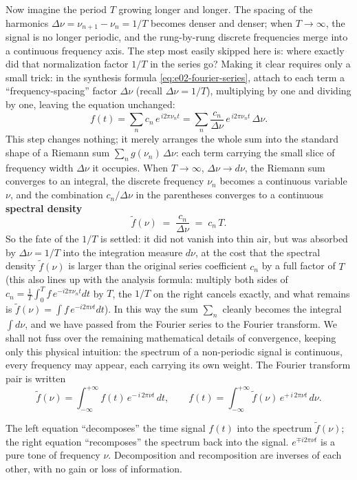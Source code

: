 Now imagine the period \(T\) growing longer and longer. The spacing of the harmonics \(\Delta\nu=\nu_{n+1}-\nu_n=1/T\) becomes denser and denser; when \(T\to\infty\), the signal is no longer periodic, and the rung-by-rung discrete frequencies merge into a continuous frequency axis. The step most easily skipped here is: where exactly did that normalization factor \(1/T\) in the series go? Making it clear requires only a small trick: in the synthesis formula \eqref{eq:e02-fourier-series}, attach to each term a ``frequency-spacing'' factor \(\Delta\nu\) (recall \(\Delta\nu=1/T\)), multiplying by one and dividing by one, leaving the equation unchanged:
\[
  f(t)=\sum_{n} c_n\,e^{\,i2\pi\nu_n t}
      =\sum_{n} \frac{c_n}{\Delta\nu}\,e^{\,i2\pi\nu_n t}\,\Delta\nu .
\]
This step changes nothing; it merely arranges the whole sum into the standard shape of a Riemann sum \(\sum_n g(\nu_n)\,\Delta\nu\): each term carrying the small slice of frequency width \(\Delta\nu\) it occupies. When \(T\to\infty\), \(\Delta\nu\to d\nu\), the Riemann sum converges to an integral, the discrete frequency \(\nu_n\) becomes a continuous variable \(\nu\), and the combination \(c_n/\Delta\nu\) in the parentheses converges to a continuous \textbf{spectral density}
\[
  \tilde f(\nu)\;=\;\frac{c_n}{\Delta\nu}\;=\;c_n\,T .
\]
So the fate of the \(1/T\) is settled: it did not vanish into thin air, but was absorbed by \(\Delta\nu=1/T\) into the integration measure \(d\nu\), at the cost that the spectral density \(\tilde f(\nu)\) is larger than the original series coefficient \(c_n\) by a full factor of \(T\) (this also lines up with the analysis formula: multiply both sides of \(c_n=\frac1T\int_0^T f\,e^{-i2\pi\nu_n t}dt\) by \(T\), the \(1/T\) on the right cancels exactly, and what remains is \(\tilde f(\nu)=\int f\,e^{-i2\pi\nu t}dt\)). In this way the sum \(\sum_n\) cleanly becomes the integral \(\int d\nu\), and we have passed from the Fourier series to the Fourier transform. We shall not fuss over the remaining mathematical details of convergence, keeping only this physical intuition: the spectrum of a non-periodic signal is continuous, every frequency may appear, each carrying its own weight. The Fourier transform pair is written
\begin{equation}
  \tilde f(\nu)=\int_{-\infty}^{+\infty} f(t)\,e^{-\,i\,2\pi\nu t}\,dt,
  \qquad
  f(t)=\int_{-\infty}^{+\infty} \tilde f(\nu)\,e^{+\,i\,2\pi\nu t}\,d\nu .
  \label{eq:e02-fourier-transform}
\end{equation}
\begin{formulaexplain}
The left equation ``decomposes'' the time signal \(f(t)\) into the spectrum \(\tilde f(\nu)\); the right equation ``recomposes'' the spectrum back into the signal. \(e^{\mp i2\pi\nu t}\) is a pure tone of frequency \(\nu\). Decomposition and recomposition are inverses of each other, with no gain or loss of information.
\end{formulaexplain}
